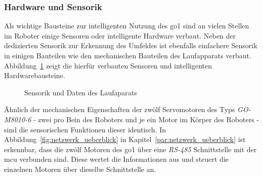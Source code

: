 \subsubsection{Hardware und Sensorik}
\label{subsubsec:hardware_sensorik}

Als wichtige Bausteine zur intelligenten Nutzung des \gls{go1} sind an vielen Stellen im Roboter
einige Sensoren oder intelligente Hardware verbaut.
Neben der dedizierten Sensorik zur Erkennung des Umfeldes ist ebenfalls einfachere Sensorik
in einigen Bauteilen wie den mechanischen Bauteilen des Laufapparats verbaut.
Abbildung~\ref{fig:laufapparat} zeigt die hierfür verbauten Sensoren und intelligenten Hardwarebausteine.

\begin{figure}[h]
    \caption{Sensorik und Daten des Laufaparats}\label{fig:laufapparat}
\end{figure}

Ähnlich der mechanischen Eigenschaften der zwölf Servomotoren des Typs \emph{GO-M8010-6} - zwei pro Bein des Roboters 
und je ein Motor im Körper des Roboters  - sind die sensorischen Funktionen dieser identisch.
In Abbildung~\ref{fig:netzwerk_ueberblick} in Kapitel~\ref{par:netzwerk_ueberblick} ist erkennbar, dass die
zwölf Motoren des \gls{go1} über eine \emph{RS-485} Schnittstelle mit der \gls{mcu} verbunden sind.
Diese wertet die Informationen aus und steuert die einzelnen Motoren über dieselbe Schnittstelle an.

